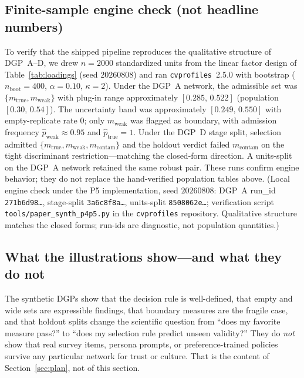 \documentclass[10pt,letterpaper]{article}
\newcommand{\cvp}{\texttt{cvprofiles}}
\begin{document}
\subsection{Finite-sample engine check (not headline numbers)}
To verify that the shipped pipeline reproduces the qualitative structure of DGP~A--D, we drew $n{=}2000$ standardized units from the linear factor design of Table~\ref{tab:loadings} (seed $20260808$) and ran \cvp{}~2.5.0 with bootstrap ($n_{\mathrm{boot}}{=}400$, $\alpha{=}0.10$, $\kappa{=}2$).
Under the DGP~A network, the admissible set was $\{m_{\mathrm{true}},m_{\mathrm{weak}}\}$ with plug-in range approximately $[0.285,\,0.522]$ (population $[0.30,\,0.54]$).
The uncertainty band was approximately $[0.249,\,0.550]$ with empty-replicate rate $0$; only $m_{\mathrm{weak}}$ was flagged as boundary, with admission frequency $\hat p_{\mathrm{weak}}\approx 0.95$ and $\hat p_{\mathrm{true}}=1$.
Under the DGP~D stage split, selection admitted $\{m_{\mathrm{true}},m_{\mathrm{weak}},m_{\mathrm{contam}}\}$ and the holdout verdict failed $m_{\mathrm{contam}}$ on the tight discriminant restriction---matching the closed-form direction.
A units-split on the DGP~A network retained the same robust pair.
These runs confirm engine behavior; they do not replace the hand-verified population tables above.
(Local engine check under the P5 implementation, seed $20260808$: DGP~A run\_id \texttt{271b6d98\ldots}, stage-split \texttt{3a6c8f8a\ldots}, units-split \texttt{8508062e\ldots}; verification script \texttt{tools/paper\_synth\_p4p5.py} in the \cvp{} repository. Qualitative structure matches the closed forms; run-ids are diagnostic, not population quantities.)

\subsection{What the illustrations show---and what they do not}
The synthetic DGPs show that the decision rule is well-defined, that empty and wide sets are expressible findings, that boundary measures are the fragile case, and that holdout splits change the scientific question from ``does my favorite measure pass?'' to ``does my selection rule predict unseen validity?''
They do \emph{not} show that real survey items, persona prompts, or preference-trained policies survive any particular network for trust or culture.
That is the content of Section~\ref{sec:plan}, not of this section.

\end{document}
